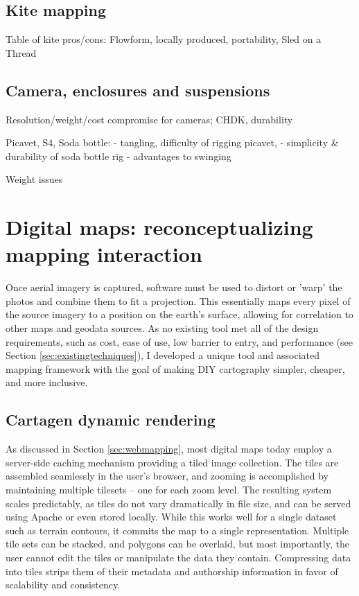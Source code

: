 \documentclass[11pt]{report}
\begin{document}
\subsection{Kite mapping}

Table of kite pros/cons: Flowform, locally produced, portability, Sled on a Thread

\subsection{Camera, enclosures and suspensions}
\label{subsec:cameraenclosures}
Resolution/weight/cost compromise for cameras; CHDK, durability

Picavet, S4, Soda bottle: 
- tangling, difficulty of rigging picavet, 
- simplicity \& durability of soda bottle rig
- advantages to swinging

Weight issues

\section{Digital maps: reconceptualizing mapping interaction}

Once aerial imagery is captured, software must be used to distort or 'warp' the photos and combine them to fit a projection. This essentially maps every pixel of the source imagery to a position on the earth's surface, allowing for correlation to other maps and geodata sources. As no existing tool met all of the design requirements, such as cost, ease of use, low barrier to entry, and performance (see Section \ref{sec:existingtechniques}), I developed a unique tool and associated mapping framework with the goal of making DIY cartography simpler, cheaper, and more inclusive.

\subsection{Cartagen dynamic rendering}

As discussed in Section \ref{sec:webmapping}, most digital maps today employ a server-side caching mechanism providing a tiled image collection. The tiles are assembled seamlessly in the user's browser, and zooming is accomplished by maintaining multiple tilesets -- one for each zoom level. The resulting system scales predictably, as tiles do not vary dramatically in file size, and can be served using Apache or even stored locally. While this works well for a single dataset such as terrain contours, it commits the map to a single representation. Multiple tile sets can be stacked, and polygons can be overlaid, but most importantly, the user cannot edit the tiles or manipulate the data they contain. Compressing data into tiles strips them of their metadata and authorship information in favor of scalability and consistency. 
\end{document}
